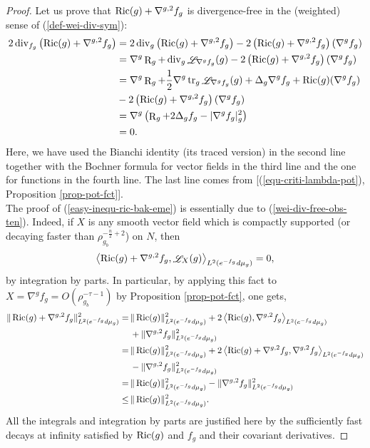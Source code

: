 \documentclass[a4paper,11pt,reqno]{amsart}
\def\Ric{\mathop{\rm Ric}\nolimits}
\def\tr{\mathop{\rm tr}\nolimits}
\def\div{\mathop{\rm div}\nolimits}
\def\Li{\mathop{\rm \mathscr{L}}\nolimits}
\def\Ric{\mathop{\rm Ric}\nolimits}
\def\tr{\mathop{\rm tr}\nolimits}
\def\div{\mathop{\rm div}\nolimits}
\def\Li{\mathop{\rm \mathscr{L}}\nolimits}
\def\R{\mathop{\rm R}\nolimits}
\numberwithin{equation}{section}
\begin{document}
	\begin{proof}
	Let us prove that $\Ric(g)+\nabla^{g,2}f_g$ is divergence-free in the (weighted) sense of (\ref{def-wei-div-sym}):
		\begin{equation}
		\begin{split}
		2\div_{f_g}\left(\Ric(g)+\nabla^{g,2}f_g\right)&=2\div_g\left(\Ric(g)+\nabla^{g,2}f_g\right)-2\left(\Ric(g)+\nabla^{g,2}f_g\right)(\nabla^gf_g)\\
		&=\nabla^g\R_g+\div_g\Li_{\nabla^gf_g}(g)-2\left(\Ric(g)+\nabla^{g,2}f_g\right)(\nabla^gf_g)\\
		&=\nabla^g\R_g+\frac{1}{2}\nabla^g\tr_g\Li_{\nabla^gf_g}(g)+\Delta_g\nabla^gf_g+\Ric(g)(\nabla^gf_g)\\
		&-2\left(\Ric(g)+\nabla^{g,2}f_g\right)(\nabla^gf_g)\\
		&=\nabla^g\left(\R_g+2\Delta_gf_g-|\nabla^gf_g|^2_g\right)\\
		&=0.
		\end{split}
		\end{equation}
		Here, we have used the Bianchi identity (its traced version) in the second line together with the Bochner formula for vector fields in the third line and the one for functions in the fourth line. The last line comes from [(\ref{equ-criti-lambda-pot}), Proposition \ref{prop-pot-fct}].\\
		
		The proof of (\ref{easy-inequ-ric-bak-eme}) is essentially due to (\ref{wei-div-free-obs-ten}).
		Indeed, if $X$ is any smooth vector field which is compactly supported (or decaying faster than $\rho_{g_b}^{-\frac{n}{2}+2}$) on $N$, then 
		\begin{equation*}
		\begin{split}
		\left<\Ric(g)+\nabla^{g,2}f_g,\Li_X(g)\right>_{L^2(e^{-f_g}d\mu_g)}=0,
		\end{split}
		\end{equation*}
		by integration by parts. In particular, by applying this fact to $X=\nabla^{g}f_g=O(\rho_{g_b}^{-\tau-1})$ by Proposition \ref{prop-pot-fct}, one gets, 
		\begin{equation}
		\begin{split}
		\|\Ric(g)+\nabla^{g,2}f_g\|_{L^2(e^{-f_g}d\mu_g)}^2=\,&\|\Ric(g)\|^2_{L^2(e^{-f_g}d\mu_g)}+2\left<\Ric(g),\nabla^{g,2}f_g\right>_{L^2(e^{-f_g}d\mu_g)}\\
		&+\|\nabla^{g,2}f_g\|^2_{L^2(e^{-f_g}d\mu_g)}\\
		=\,&\|\Ric(g)\|^2_{L^2(e^{-f_g}d\mu_g)}+2\left<\Ric(g)+\nabla^{g,2}f_g,\nabla^{g,2}f_g\right>_{L^2(e^{-f_g}d\mu_g)}\\
		&-\|\nabla^{g,2}f_g\|^2_{L^2(e^{-f_g}d\mu_g)}\\
		=\,&\|\Ric(g)\|^2_{L^2(e^{-f_g}d\mu_g)}-\|\nabla^{g,2}f_g\|^2_{L^2(e^{-f_g}d\mu_g)}\\
		\leq\,& \|\Ric(g)\|^2_{L^2(e^{-f_g}d\mu_g)}.
		\end{split}
		\end{equation}
		All the integrals and integration by parts are justified here by the sufficiently fast decays at infinity satisfied by $\Ric(g)$ and $f_g$ and their covariant derivatives.
		
		
	\end{proof}
	
\end{document}
